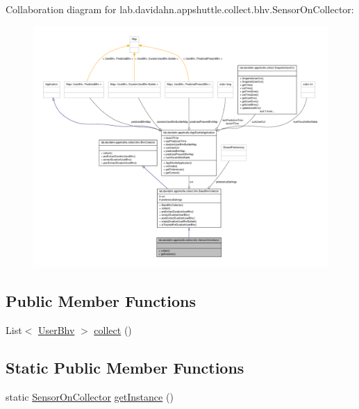 \-Collaboration diagram for lab.\-davidahn.\-appshuttle.\-collect.\-bhv.\-Sensor\-On\-Collector\-:
\nopagebreak
\begin{figure}[H]
\begin{center}
\leavevmode
\includegraphics[width=350pt]{classlab_1_1davidahn_1_1appshuttle_1_1collect_1_1bhv_1_1_sensor_on_collector__coll__graph}
\end{center}
\end{figure}
\subsection*{\-Public \-Member \-Functions}
\begin{DoxyCompactItemize}
\item 
\-List$<$ \hyperlink{interfacelab_1_1davidahn_1_1appshuttle_1_1collect_1_1bhv_1_1_user_bhv}{\-User\-Bhv} $>$ \hyperlink{classlab_1_1davidahn_1_1appshuttle_1_1collect_1_1bhv_1_1_sensor_on_collector_a07aec1c8ba1283ef42ca0237482bac17}{collect} ()
\end{DoxyCompactItemize}
\subsection*{\-Static \-Public \-Member \-Functions}
\begin{DoxyCompactItemize}
\item 
static \hyperlink{classlab_1_1davidahn_1_1appshuttle_1_1collect_1_1bhv_1_1_sensor_on_collector}{\-Sensor\-On\-Collector} \hyperlink{classlab_1_1davidahn_1_1appshuttle_1_1collect_1_1bhv_1_1_sensor_on_collector_a460c8a676d11d0ee1b769d78f453e930}{get\-Instance} ()
\end{DoxyCompactItemize}


